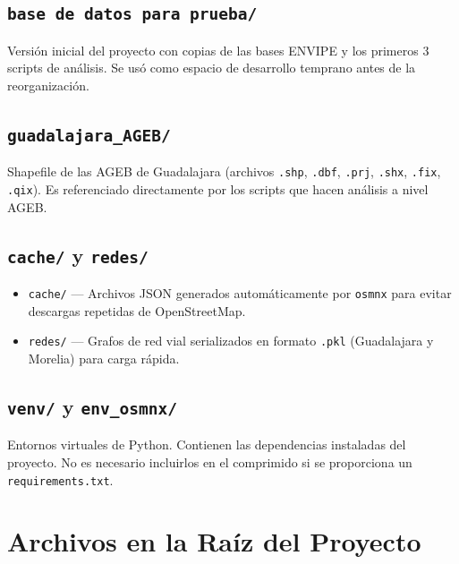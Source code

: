 \documentclass[12pt, a4paper]{article}
\begin{document}
\subsection{\texttt{base de datos para prueba/}}
Versión inicial del proyecto con copias de las bases ENVIPE y los primeros 3 scripts de análisis. Se usó como espacio de desarrollo temprano antes de la reorganización.

\subsection{\texttt{guadalajara\_AGEB/}}
Shapefile de las AGEB de Guadalajara (archivos \texttt{.shp}, \texttt{.dbf}, \texttt{.prj}, \texttt{.shx}, \texttt{.fix}, \texttt{.qix}). Es referenciado directamente por los scripts que hacen análisis a nivel AGEB.

\subsection{\texttt{cache/} y \texttt{redes/}}
\begin{itemize}[nosep]
    \item \texttt{cache/} --- Archivos JSON generados automáticamente por \texttt{osmnx} para evitar descargas repetidas de OpenStreetMap.
    \item \texttt{redes/} --- Grafos de red vial serializados en formato \texttt{.pkl} (Guadalajara y Morelia) para carga rápida.
\end{itemize}

\subsection{\texttt{venv/} y \texttt{env\_osmnx/}}
Entornos virtuales de Python. Contienen las dependencias instaladas del proyecto. No es necesario incluirlos en el comprimido si se proporciona un \texttt{requirements.txt}.

\section{Archivos en la Raíz del Proyecto}
\end{document}
